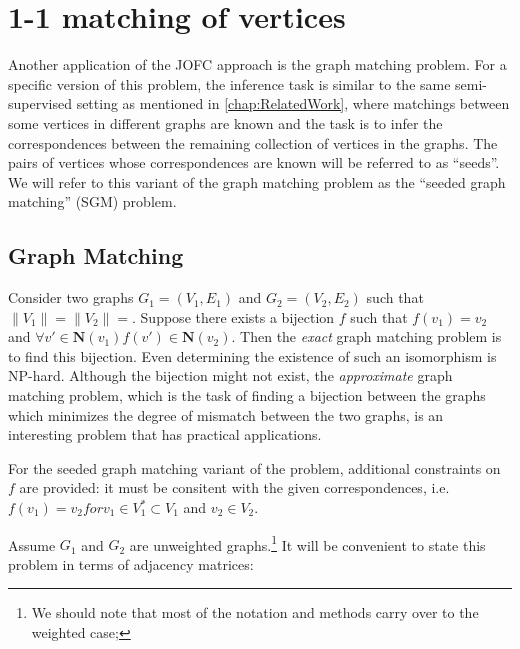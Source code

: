 \documentclass[12pt,oneside,final]{thesis}\usepackage[]{graphicx}\usepackage[]{color}
\begin{document}
\section{1-1 matching of vertices}

Another application of  the JOFC approach is  the graph matching problem. For a specific version of this problem, the  inference task is similar to  the same semi-supervised setting as mentioned in \ref{chap:RelatedWork}, where matchings between some vertices in different graphs are known 
  and the task is to infer the correspondences between the remaining collection of vertices in the graphs.  The pairs of vertices whose correspondences are known will be referred to as ``seeds''. We will refer to this variant of the graph matching problem as the ``seeded graph matching'' (SGM) problem.
 
\subsection{Graph Matching}
Consider two  graphs $G_1=(V_1,E_1)$ and $G_2=(V_2,E_2)$ such that $\| V_1 \|=\| V_2 \|=$. Suppose there exists a bijection $f$   such that $f(v_1)=v_2$ and $\forall v' \in \mathbf{N}(v_1) f(v') \in \mathbf{N}(v_2)$. Then the \emph{exact} graph matching problem  is to find this bijection. Even determining the existence  of such an isomorphism is NP-hard.  Although the bijection might not exist,  the \emph{approximate} graph matching problem, which is the task of  finding a bijection between the
graphs which minimizes the degree  of mismatch   between the two graphs, is an interesting problem that has practical applications\cite{GraphMatchReview,Bengoetxea2002,recentdevGraphMatching2000,VogConGraphMatchFAQ,Zaslavskiy2009}.



For the seeded graph matching variant of the problem, additional constraints on $f$ are provided: it must be consitent with the given correspondences, i.e.  $f(v_1)=v_2 for v_1 \in V_1^{*} \subset V_1$ and $v_2 \in V_2$. 

Assume $G_1$ and $G_2$ are unweighted graphs.\footnote{We should note that most of the notation and methods carry over to the weighted case;} It will be convenient to state this problem in terms of adjacency matrices:
\end{document}
